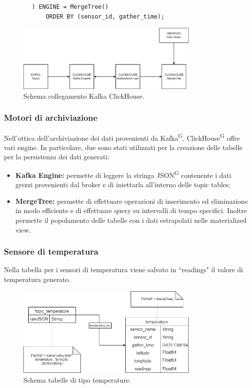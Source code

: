 \documentclass[8pt]{article}
\newcommand{\glossterm}[1]{#1\textsuperscript{G}} %
\begin{document}
\begin{itemize}
\begin{verbatim}
        ) ENGINE = MergeTree()
            ORDER BY (sensor_id, gather_time);
    \end{verbatim}
\end{itemize}
\begin{figure}[h!]
    \centering
    \includegraphics[width=0.8\textwidth]{images_st/kafka-clickhouse.png}
    \caption{Schema collegamento Kafka ClickHouse.}
    \label{fig:Schema collegamento Kafka ClickHouse}
\end{figure}
\subsubsection{Motori di archiviazione}
Nell'ottica dell'archiviazione dei dati provenienti da \glossterm{Kafka}, \glossterm{ClickHouse} offre vari engine. In particolare, due sono stati utilizzati per la creazione delle tabelle per la persistenza dei dati generati:
\begin{itemize}
    \item \textbf{Kafka Engine:} permette di leggere la stringa \glossterm{JSON} contenente i dati grezzi provenienti dal broker e di iniettarla all’interno delle topic tables;
    \item \textbf{MergeTree:} permette di effettuare operazioni di inserimento ed eliminazione in modo efficiente e di effettuare query su intervalli di tempo specifici. Inoltre permette il popolamento delle tabelle con i dati estrapolati nelle materialized view. 
\end{itemize}
\subsubsection{Sensore di temperatura}
Nella tabella per i sensori di temperatura viene salvato in ``readings" il valore di temperatura generato.
\begin{figure}[h!]
    \centering
    \includegraphics[width=0.8\textwidth]{images_st/tabelle_temperature.png}
    \caption{Schema tabelle di tipo temperature.}
    \label{fig:Schema tabelle di tipo temperature}
\end{figure}
\clearpage
\end{document}

